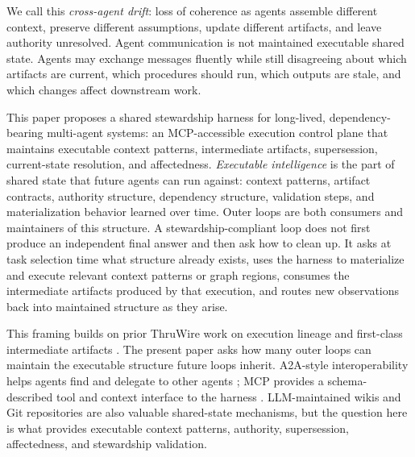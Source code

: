 \documentclass{article}
\begin{document}
We call this \emph{cross-agent drift}: loss of coherence as agents assemble different context, preserve different assumptions, update different artifacts, and leave authority unresolved. Agent communication is not maintained executable shared state. Agents may exchange messages fluently while still disagreeing about which artifacts are current, which procedures should run, which outputs are stale, and which changes affect downstream work.

This paper proposes a shared stewardship harness for long-lived, dependency-bearing multi-agent systems: an MCP-accessible execution control plane that maintains executable context patterns, intermediate artifacts, supersession, current-state resolution, and affectedness. \emph{Executable intelligence} is the part of shared state that future agents can run against: context patterns, artifact contracts, authority structure, dependency structure, validation steps, and materialization behavior learned over time. Outer loops are both consumers and maintainers of this structure. A stewardship-compliant loop does not first produce an independent final answer and then ask how to clean up. It asks at task selection time what structure already exists, uses the harness to materialize and execute relevant context patterns or graph regions, consumes the intermediate artifacts produced by that execution, and routes new observations back into maintained structure as they arise.

This framing builds on prior ThruWire work on execution lineage and first-class intermediate artifacts \cite{rosen2026lineage,rosen2026artifacts}. The present paper asks how many outer loops can maintain the executable structure future loops inherit. A2A-style interoperability helps agents find and delegate to other agents \cite{a2a2026spec}; MCP provides a schema-described tool and context interface to the harness \cite{mcp2025intro,mcp2025tools,mcp2025resources,mcp2025prompts}. LLM-maintained wikis and Git repositories are also valuable shared-state mechanisms, but the question here is what provides executable context patterns, authority, supersession, affectedness, and stewardship validation.
\end{document}
